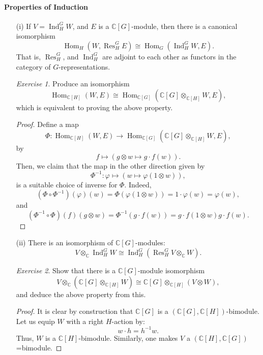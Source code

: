 \documentclass[a4paper]{report}
\theoremstyle{definition}
\theoremstyle{remark}
\theoremstyle{proposition}
\theoremstyle{conjecture}
\theoremstyle{lemma}
\theoremstyle{corollary}
\theoremstyle{exercise}
\newtheorem{exercise}{Exercise}
\theoremstyle{example}
\newcommand{\C}{\mathbb{C}}
\newcommand{\on}{\operatorname}
\begin{document}
\paragraph{Properties of Induction}
\begin{itemize}
    \item[(i)] If $V = \on{Ind}_H^GW$, and $E$ is a $\C[G]$-module, then 
        there is a canonical isomorphism
        $$\on{Hom}_H(W,\on{Res}_H^GE) \cong \on{Hom}_G(\on{Ind}_H^GW,E).$$
        That is, $\on{Res}_H^G$, and $\on{Ind}_H^G$ are adjoint 
        to each other as functors in the category of $G$-representations.
        \begin{exercise}
            Produce an isomorphism 
            $$\on{Hom}_{\C[H]}(W,E) \cong \on{Hom}_{\C[G]}(\C[G]\otimes_{\C[H]}W, E),$$
            which is equivalent to proving the above property.
        \end{exercise}
        \begin{proof}
            Define a map 
            $$\Phi : \on{Hom}_{\C[H]}(W,E) \longrightarrow \on{Hom}_{\C[G]}(\C[G]\otimes_{\C[H]}W,E),$$
            by $$f \longmapsto (g\otimes w \longmapsto g\cdot f(w)).$$
            Then, we claim that the map in the other direction given by 
            $$\Phi^{-1} : \varphi \longmapsto (w\longmapsto \varphi(1\otimes w)),$$
            is a suitable choice of inverse for $\Phi$.
            Indeed,
            $$(\Phi \circ \Phi^{-1})(\varphi)(w) = \Phi(\varphi(1\otimes w)) = 1\cdot \varphi(w) = \varphi(w),$$
            and 
            $$(\Phi^{-1}\circ \Phi)(f)(g\otimes w) = \Phi^{-1}(g\cdot f(w)) = g\cdot f(1\otimes w)  g\cdot f(w).$$
        \end{proof}
    \item[(ii)] There is an isomorphism of $\C[G]$-modules:
        $$V\otimes_\C \on{Ind}_H^G W \cong \on{Ind}_H^G (\on{Res}_H^GV\otimes_\C W).$$
        \begin{exercise}
            Show that there is a $\C[G]$-module isomorphism
            $$V \otimes_\C (\C[G] \otimes_{\C[H]} W) \cong \C[G]\otimes_{\C[H]} (V\otimes W),$$
            and deduce the above property from this.
        \end{exercise}
        \begin{proof}
            It is clear by construction that $\C[G]$
            is a $(\C[G],\C[H])$-bimodule.
            Let us equip $W$ with a right $H$-action by:
            $$w\cdot h = h^{-1}w.$$
            Thus, $W$ is a $\C[H]$-bimodule.
            Similarly, one makes $V$ a $(\C[H],\C[G])$=bimodule.

\end{proof}
\end{itemize}
\end{document}
